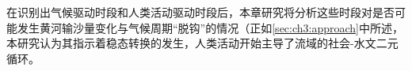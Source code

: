 在识别出气候驱动时段和人类活动驱动时段后，本章研究将分析这些时段对是否可能发生黄河输沙量变化与气候周期“脱钩”的情况（正如\ref{sec:ch3:approach}中所述，本研究认为其指示着稳态转换的发生，人类活动开始主导了流域的社会-水文二元循环。





